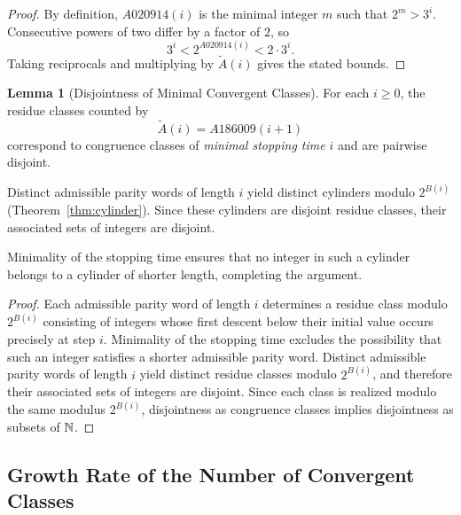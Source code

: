 \documentclass[12pt, oneside]{article}   	%
\numberwithin{equation}{section}          %
\theoremstyle{definition}
\newtheorem{lemma}[theorem]{Lemma}
\begin{document}
\begin{proof}
By definition, $A020914(i)$ is the minimal integer $m$ such that $2^m > 3^i$.
Consecutive powers of two differ by a factor of $2$, so
\[
3^i < 2^{A020914(i)} < 2 \cdot 3^i.
\]
Taking reciprocals and multiplying by $\widetilde A(i)$ gives the stated bounds.
\end{proof}

\begin{lemma}[Disjointness of Minimal Convergent Classes]
\label{lem:disjoint-classes}
For each $i \ge 0$, the residue classes counted by
\[
\widetilde A(i) = A186009(i+1)
\]
correspond to congruence classes of \emph{minimal stopping time} $i$ and are pairwise disjoint.  

Distinct admissible parity words of length $i$ yield distinct cylinders
modulo $2^{B(i)}$ (Theorem~\ref{thm:cylinder}). Since these cylinders are
disjoint residue classes, their associated sets of integers are disjoint.

Minimality of the stopping time ensures that no integer in such a cylinder
belongs to a cylinder of shorter length, completing the argument.
\end{lemma}

\begin{proof}
Each admissible parity word of length $i$ determines a residue class modulo
$2^{B(i)}$ consisting of integers whose first descent below their initial value
occurs precisely at step $i$. Minimality of the stopping time excludes the
possibility that such an integer satisfies a shorter admissible parity word.
Distinct admissible parity words of length $i$ yield distinct residue classes
modulo $2^{B(i)}$, and therefore their associated sets of integers are disjoint.
Since each class is realized modulo the same modulus $2^{B(i)}$, disjointness
as congruence classes implies disjointness as subsets of $\mathbb{N}$.
\end{proof}


\subsection{Growth Rate of the Number of Convergent Classes}
\end{document}
